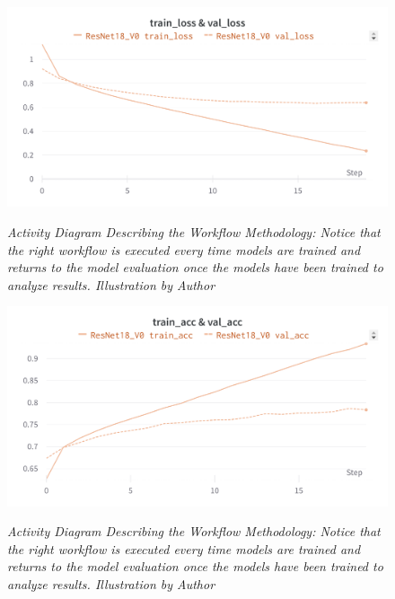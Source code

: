 \begin{figure}[H]
\centering
    \includegraphics[width=\textwidth]{imatges/results/ResNet18V0Loss.png}
\caption[Activity Diagram Describing the Methodology.]{\textit{Activity Diagram Describing the Workflow Methodology: Notice that the right workflow is executed every time models are trained and returns to the model evaluation once the models have been trained to analyze results. Illustration by Author}}
{\label{fig:flux_development}}
\end{figure}


\begin{figure}[H]
\centering
    \includegraphics[width=\textwidth]{imatges/results/ResNet18V0Acc.png}
\caption[Activity Diagram Describing the Methodology.]{\textit{Activity Diagram Describing the Workflow Methodology: Notice that the right workflow is executed every time models are trained and returns to the model evaluation once the models have been trained to analyze results. Illustration by Author}}
{\label{fig:flux_development}}
\end{figure}
